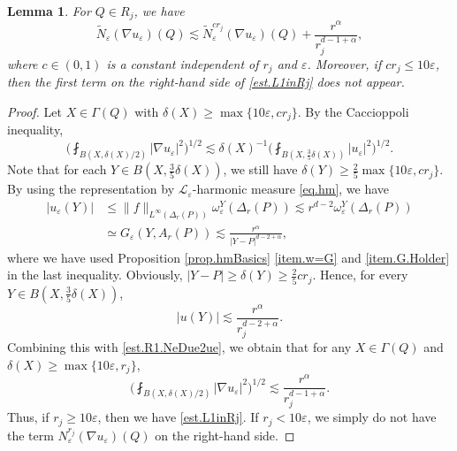 \documentclass[reqno,12pt]{amsart} %
\newtheorem{lemma}[theorem]{Lemma}
\theoremstyle{definition}
\theoremstyle{remark}
\numberwithin{equation}{section}
\newcommand{\cL}{\mathcal{L}}
\newcommand{\e}{\varepsilon}
\begin{document}
\begin{lemma}\label{lem.QinRj}
    For $Q\in R_j$, we have
    \begin{equation}\label{est.L1inRj}
        \widetilde{N}_\e(\nabla u_\e)(Q) \lesssim \widetilde{N}_\e^{cr_j}(\nabla u_\e)(Q) + \frac{r^\alpha}{r_j^{d-1+\alpha}},
    \end{equation}
    where $c\in (0,1)$ is a constant independent of $r_j$ and $\e$.
    Moreover, if $cr_j \le 10\e$, then the first term on the right-hand side of \eqref{est.L1inRj} does not appear.
\end{lemma}
\begin{proof}
    Let $X \in \Gamma(Q)$ with $\delta(X) \ge \max \{ 10\e, cr_j \}$. By the Caccioppoli inequality,
    \begin{equation}\label{est.R1.NeDue2ue}
        \bigg( \fint_{B(X,\delta(X)/2)} |\nabla u_\e|^2 \bigg)^{1/2} \lesssim \delta(X)^{-1} \bigg( \fint_{B(X,\frac35\delta(X))} | u_\e|^2 \bigg)^{1/2}.
    \end{equation}
    Note that for each $Y\in B(X,\frac35 \delta(X))$, we still have $\delta(Y) \ge \frac25 \max\{ 10\e, cr_j \}$. By using the representation by $\cL_\e$-harmonic measure \eqref{eq.hm}, we have
    \begin{equation}\label{est.ptwise.uY}
    \begin{aligned}
        |u_\e(Y)| & \le \| f \|_{L^\infty(\Delta_r(P))} \omega^Y_\e(\Delta_r(P)) \lesssim r^{d-2} \omega^Y_\e(\Delta_r(P)) \\
        & \simeq G_\e(Y, A_r(P)) \lesssim   \frac{r^\alpha }{|Y-P|^{d-2+\alpha}},
    \end{aligned}
    \end{equation}
    where we have used Proposition \ref{prop.hmBasics} \ref{item.w=G} and \ref{item.G.Holder} in the last inequality.
    Obviously, $|Y-P| \ge \delta(Y) \ge \frac25 cr_j$. Hence, for every $Y \in B(X, \frac35 \delta(X))$,
    \begin{equation}
        |u(Y)| \lesssim \frac{ r^\alpha}{ r_j^{d-2+\alpha}}.
    \end{equation}
    Combining this with \eqref{est.R1.NeDue2ue}, we obtain that for any $X\in \Gamma(Q)$ and $\delta(X) \ge \max\{ 10\e, r_j\}$,
    \begin{equation}
        \bigg( \fint_{B(X,\delta(X)/2)} |\nabla u_\e|^2 \bigg)^{1/2} \lesssim \frac{ r^\alpha}{ r_j^{d-1+\alpha}}.
    \end{equation}
    Thus, if $r_j \ge 10\e$, then we have \eqref{est.L1inRj}. If $r_j < 10\e$, we simply do not have the term $N_\e^{r_j}(\nabla u_\e)(Q)$ on the right-hand side.
\end{proof}
\end{document}
